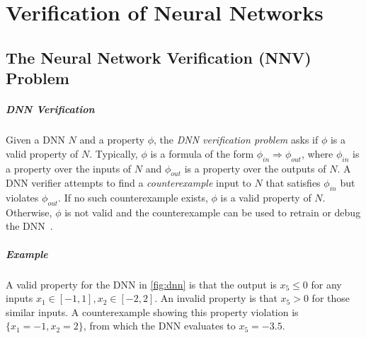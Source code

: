 \documentclass[oneside,11pt,dvipsnames]{book}
\begin{document}
\chapter{Verification of Neural Networks}\label{sec:verification}


\section{The Neural Network Verification (NNV) Problem}\label{sec:nnv-problem}
\paragraph{DNN Verification} Given a DNN \(N\) and a property $\phi$, the \emph{DNN verification problem} asks if $\phi$ is a valid property of $N$.
Typically, $\phi$ is a formula of the form $\phi_{in} \Rightarrow \phi_{out}$, where $\phi_{in}$ is a property over the inputs of $N$ and $\phi_{out}$ is a property over the outputs of $N$.
A DNN verifier attempts to find a \emph{counterexample} input to $N$ that satisfies $\phi_{in}$ but violates $\phi_{out}$.  If no such counterexample exists, $\phi$ is a valid property of $N$. Otherwise, $\phi$ is not valid and the counterexample can be used to retrain or debug the DNN~\cite{huang2017safety}.









\paragraph{Example} A valid property for the DNN in \autoref{fig:dnn} is that the output is $x_5 \le 0$ for any inputs $x_1 \in [-1,1], x_2\in[-2,2]$. An invalid property is that $x_5 > 0$ for those similar inputs.
A counterexample showing this property violation is $\{x_1=-1, x_2=2\}$, from which the DNN evaluates to $x_5=-3.5$. 
\end{document}

